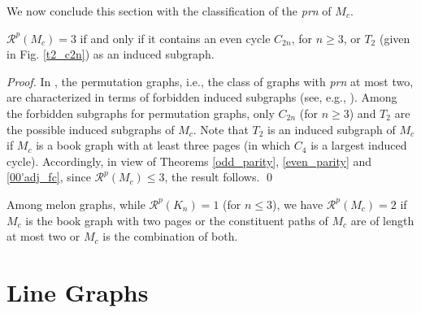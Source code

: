 \documentclass{llncs}
\begin{document}
We now conclude this section with the classification of the \textit{prn} of $M_c$.

\begin{theorem}
	$\mathcal{R}^p(M_c) = 3$ if and only if it contains an even cycle $C_{2n}$, for $n \ge 3$, or $T_2$ (given in Fig. \ref{t2_c2n}) as an induced subgraph.
\end{theorem}
\begin{proof}
	In \cite{Gallai}, the permutation graphs, i.e., the class of graphs with \textit{prn} at most two, are characterized in terms of forbidden induced subgraphs (see, e.g., \cite[Theorem 7, Page 200]{Vincent}). Among the forbidden subgraphs for permutation graphs, only $C_{2n}$ (for $n \ge 3$) and $T_2$ are the possible induced subgraphs of $M_c$. Note that $T_2$ is an induced subgraph of $M_c$ if $M_c$ is a book graph with at least three pages (in which $C_4$ is a largest induced cycle). Accordingly, in view of Theorems \ref{odd_parity}, \ref{even_parity} and \ref{00'adj_fc}, since $\mathcal{R}^p(M_c) \le 3$, the result follows. 	\qed
\end{proof}    

\begin{remark}
	Among melon graphs, while $\mathcal{R}^p(K_n) = 1$ (for $n \le 3$), we have $\mathcal{R}^p(M_c) = 2$ if $M_c$ is the book graph with two pages or the constituent paths of $M_c$ are of length at most two or $M_c$ is the combination of both. 
\end{remark}    

\section{Line Graphs}
\label{line_melon}
\end{document}
